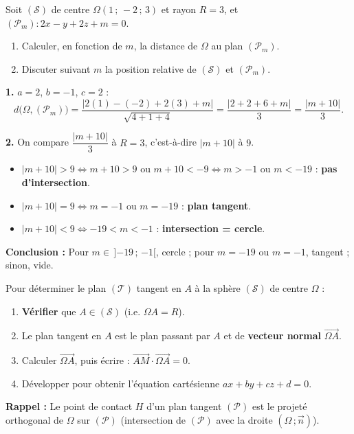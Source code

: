 \documentclass[11pt]{article}
\begin{document}
\begin{exoresolu}
Soit $(\mathcal{S})$ de centre $\Omega(1\,;\,-2\,;\,3)$ et rayon $R=3$, et $(\mathcal{P}_m) : 2x-y+2z+m=0$.
\begin{enumerate}
\item Calculer, en fonction de $m$, la distance de $\Omega$ au plan $(\mathcal{P}_m)$.
\item Discuter suivant $m$ la position relative de $(\mathcal{S})$ et $(\mathcal{P}_m)$.
\end{enumerate}
\tcblower
\textbf{1.} $a=2$, $b=-1$, $c=2$ :
\[ d\big(\Omega,(\mathcal{P}_m)\big) = \frac{|2(1)-(-2)+2(3)+m|}{\sqrt{4+1+4}} = \frac{|2+2+6+m|}{3} = \frac{|m+10|}{3}. \]

\textbf{2.} On compare $\dfrac{|m+10|}{3}$ à $R=3$, c'est-à-dire $|m+10|$ à $9$.
\begin{itemize}
\item $|m+10|>9 \iff m+10>9$ ou $m+10<-9 \iff m>-1$ ou $m<-19$ : \textbf{pas d'intersection}.
\item $|m+10|=9 \iff m=-1$ ou $m=-19$ : \textbf{plan tangent}.
\item $|m+10|<9 \iff -19<m<-1$ : \textbf{intersection = cercle}.
\end{itemize}

\textbf{Conclusion :} Pour $m\in\,]{-19}\,;\,{-1}[$, cercle ; pour $m=-19$ ou $m=-1$, tangent ; sinon, vide.
\end{exoresolu}

\begin{methode}
Pour déterminer le plan $(\mathcal{T})$ tangent en $A$ à la sphère $(\mathcal{S})$ de centre $\Omega$ :
\begin{enumerate}
\item \textbf{Vérifier} que $A\in(\mathcal{S})$ (i.e. $\Omega A = R$).
\item Le plan tangent en $A$ est le plan passant par $A$ et de \textbf{vecteur normal} $\overrightarrow{\Omega A}$.
\item Calculer $\overrightarrow{\Omega A}$, puis écrire : $\overrightarrow{AM}\cdot\overrightarrow{\Omega A}=0$.
\item Développer pour obtenir l'équation cartésienne $ax+by+cz+d=0$.
\end{enumerate}
\textbf{Rappel :} Le point de contact $H$ d'un plan tangent $(\mathcal{P})$ est le projeté orthogonal de $\Omega$ sur $(\mathcal{P})$ (intersection de $(\mathcal{P})$ avec la droite $(\Omega\,;\vec{n})$).
\end{methode}
\end{document}
